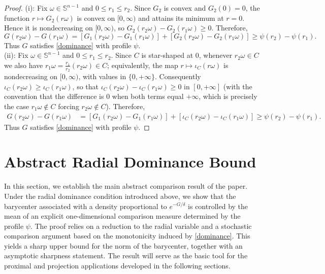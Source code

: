 \documentclass[11pt]{article}
\newcommand{\1}{\mathds{1}}
\theoremstyle{definition}
\theoremstyle{remark}
\theoremstyle{definition}
\begin{document}
\begin{proof}
(i): Fix \(\omega\in\mathbb S^{n-1}\) and \(0\le r_1\le r_2\). Since \(G_2\) is convex and \(G_2(0)=0\), the function \(r\mapsto G_2(r\omega)\) is convex on \([0,\infty)\) and attains its minimum at \(r=0\). Hence it is nondecreasing on \([0,\infty)\), so $G_2(r_2\omega)-G_2(r_1\omega)\ge 0$. Therefore,
\begin{equation*}
G(r_2\omega)-G(r_1\omega)
=
[G_1(r_2\omega)-G_1(r_1\omega)]
+
[G_2(r_2\omega)-G_2(r_1\omega)] \ge
\psi(r_2)-\psi(r_1).
\end{equation*}
Thus \(G\) satisfies \eqref{dominance} with profile \(\psi\).   \\
(ii): Fix \(\omega\in\mathbb S^{n-1}\) and \(0\le r_1\le r_2\). Since \(C\) is star-shaped at \(0\), whenever \(r_2\omega\in C\) we also have \(r_1\omega=\frac{r_1}{r_2}(r_2\omega)\in C\); equivalently, the map \(r\mapsto\iota_C(r\omega)\) is nondecreasing on \([0,\infty)\), with values in \(\{0,+\infty\}\). Consequently \(\iota_C(r_2\omega)\ge\iota_C(r_1\omega)\), so that
$\iota_C(r_2\omega)-\iota_C(r_1\omega)\ge 0$ in \([0,+\infty]\) (with the convention that the difference is \(0\) when both terms equal \(+\infty\), which is precisely the case \(r_1\omega\notin C\) forcing \(r_2\omega\notin C\)).
Therefore,
\begin{equation*}
\begin{aligned}
G(r_2\omega)-G(r_1\omega)
&=
[G_1(r_2\omega)-G_1(r_1\omega)]
+
[\iota_C(r_2\omega)-\iota_C(r_1\omega)]\ge
\psi(r_2)-\psi(r_1).
\end{aligned}
\end{equation*}
Thus \(G\) satisfies \eqref{dominance} with profile \(\psi\).
\end{proof}





\section{Abstract Radial Dominance Bound}\label{abstract-radial-dominance}

In this section, we establish the main abstract comparison result of the paper. Under the radial dominance condition introduced above, we show that the barycenter associated with a density proportional to \(e^{-G/\delta}\) is controlled by the mean of an explicit one-dimensional comparison measure determined by the profile \(\psi\). The proof relies on a reduction to the radial variable and a stochastic comparison argument based on the monotonicity induced by \eqref{dominance}. This yields a sharp upper bound for the norm of the barycenter, together with an asymptotic sharpness statement. The result will serve as the basic tool for the proximal and projection applications developed in the following sections.
\end{document}
